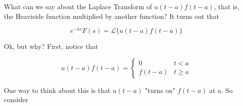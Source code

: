\documentclass{article}
\theoremstyle{definition}
\begin{document}
\bigskip
\noindent
What can we say about the Laplace Transform of $u(t-a)f(t-a)$, that is, the Heaviside function multiplied by another function? It turns out that

\bigskip
\begin{equation*}
e^{-as} F(s) = \mathcal{L}\{u(t-a) f(t-a)\}
\label{eqn:lt_uf}
\end{equation*}


\bigskip
\noindent
Ok, but why? First, notice that

\bigskip
\begin{equation*}
u(t-a)f(t-a) =  
           \begin{cases} 
               0        & t < a  \\
               f(t-a)  & t \geq a
           \end{cases}
\end{equation*}

\bigskip
\noindent
One way to think about this is that $u(t-a)$ "turns on" $f(t-a)$ at $a$. So consider
\end{document}
